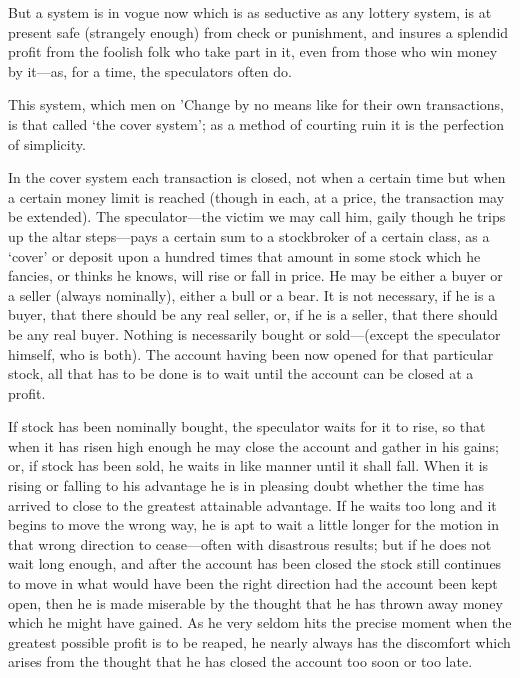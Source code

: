 \documentclass[letterpaper,12pt,oneside,openany]{memoir}
\begin{document}
But a system is in vogue now which is as seductive
as any lottery system, is at present safe (strangely
enough) from check or punishment, and insures a
splendid profit from the foolish folk who take part in it,
even from those who win money by it---as, for a time,
the speculators often do.

This system, which men on 'Change by no means
like for their own transactions, is that called `the cover
system'; as a method of courting ruin it is the perfection
of simplicity.

In the cover system each transaction is closed, not
when a certain time but when a certain money limit is
reached (though in each, at a price, the transaction may
be extended). The speculator---the victim we may call
him, gaily though he trips up the altar steps---pays a
certain sum to a stockbroker of a certain class, as a
`cover' or deposit upon a hundred times that amount in
some stock which he fancies, or thinks he knows, will
rise or fall in price. He may be either a buyer or a
seller (always nominally), either a bull or a bear. It is
not necessary, if he is a buyer, that there should be any
real seller, or, if he is a seller, that there should be any
real buyer. Nothing is necessarily bought or sold---(except
the speculator himself, who is both). The
account having been now opened for that particular
stock, all that has to be done is to wait until the account
can be closed at a profit.

If stock has been nominally bought, the speculator
waits for it to rise, so that when it has risen high
enough he may close the account and gather in his
gains; or, if stock has been sold, he waits in like
manner until it shall fall. When it is rising or falling
to his advantage he is in pleasing doubt whether the
time has arrived to close to the greatest attainable
advantage. If he waits too long and it begins to move
the wrong way, he is apt to wait a little longer for the
motion in that wrong direction to cease---often with
disastrous results; but if he does not wait long enough,
and after the account has been closed the stock still continues
to move in what would have been the right direction
had the account been kept open, then he is made
miserable by the thought that he has thrown away money
which he might have gained. As he very seldom hits
the precise moment when the greatest possible profit is
to be reaped, he nearly always has the discomfort which
arises from the thought that he has closed the account
too soon or too late.
\end{document}
